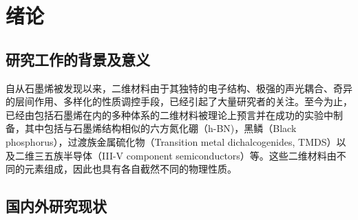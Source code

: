 \chapter{绪\hspace{6pt}论}

\section{研究工作的背景及意义}
自从石墨烯被发现以来，二维材料由于其独特的电子结构、极强的声光耦合、奇异的层间作用、多样化的性质调控手段，已经引起了大量研究者的关注。至今为止，已经由包括石墨烯在内的多种体系的二维材料被理论上预言并在成功的实验中制备，其中包括与石墨烯结构相似的六方氮化硼（h-BN)，黑鳞（Black phosphorus），过渡族金属硫化物（Transition metal dichalcogenides, TMDS）以及二维三五族半导体（III-V component semiconductors）等。这些二维材料由不同的元素组成，因此也具有各自截然不同的物理性质。


\section{国内外研究现状}